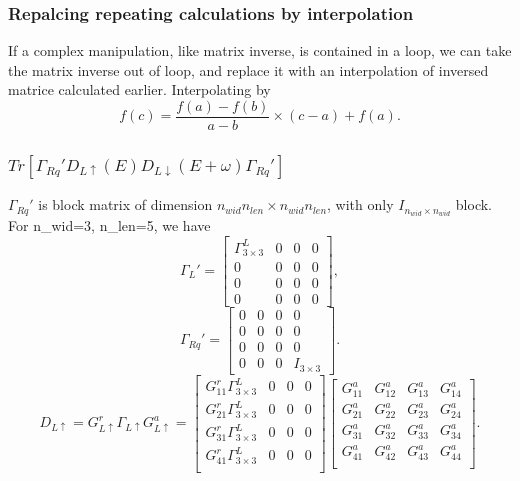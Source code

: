 \documentclass[aps,prb,superscriptaddress]{revtex4-2}
\begin{document}
\subsubsection{Repalcing repeating calculations by interpolation}
If a complex manipulation, like matrix inverse, is contained in a loop,
we can take the matrix inverse out of loop, and replace it with an interpolation of inversed matrice calculated earlier. Interpolating by
\begin{equation}
f(c) = \frac{f(a) - f(b)}{a-b}\times (c-a) + f(a).
\end{equation}
\subsubsection{$Tr[\Gamma_{Rq}'D_{L\uparrow}(E)D_{L\downarrow}(E+\omega)\Gamma_{Rq}']$}
$\Gamma_{Rq}'$ is block matrix of dimension  $n_{wid}n_{len}\times n_{wid}n_{len}$, with only $I_{n_{wid}\times n_{wid}}$ block. For n\_wid=3, n\_len=5, we have
\begin{equation}
\Gamma_{L}' = \left[\begin{array}{cccc}
\Gamma_{3\times 3}^{L} & 0 & 0 & 0 \\
0 & 0 & 0 & 0 \\
0 & 0 & 0 & 0 \\
0 & 0 & 0 & 0
\end{array}\right],
\end{equation}
\begin{equation}
\Gamma_{Rq}' = \left[\begin{array}{cccc}
0 & 0 & 0 & 0 \\
0 & 0 & 0 & 0 \\
0 & 0 & 0 & 0 \\
0 & 0 & 0 & I_{3\times 3}
\end{array}\right].
\end{equation}
\begin{equation}
D_{L\uparrow} = G_{L\uparrow}^{r}\Gamma_{L\uparrow}G_{L\uparrow}^{a} = 
\left[\begin{array}{cccc}
G_{11}^{r}\Gamma_{3\times3}^{L} & 0 & 0 & 0 \\
G_{21}^{r}\Gamma_{3\times3}^{L} & 0 & 0 & 0 \\
G_{31}^{r}\Gamma_{3\times3}^{L} & 0 & 0 & 0 \\
G_{41}^{r}\Gamma_{3\times3}^{L} & 0 & 0 & 0 \\
\end{array}\right]
\left[\begin{array}{cccc}
G_{11}^{a} & G_{12}^{a} & G_{13}^{a} & G_{14}^{a} \\
G_{21}^{a} & G_{22}^{a} & G_{23}^{a} & G_{24}^{a} \\
G_{31}^{a} & G_{32}^{a} & G_{33}^{a} & G_{34}^{a} \\
G_{41}^{a} & G_{42}^{a} & G_{43}^{a} & G_{44}^{a} \\
\end{array}\right].
\end{equation}
\end{document}
